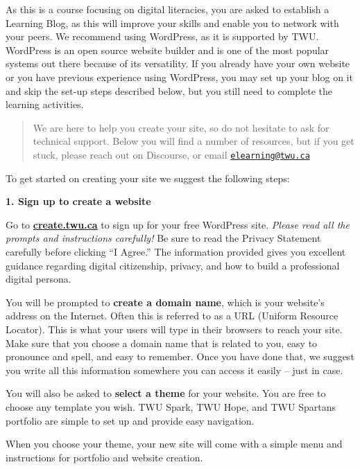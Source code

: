 \documentclass[
]{book}
\theoremstyle{definition}
\theoremstyle{definition}
\theoremstyle{definition}
\theoremstyle{definition}
\theoremstyle{remark}
\begin{document}
\begin{reflect}
As this is a course focusing on digital literacies, you are asked to establish a Learning Blog, as this will improve your skills and enable you to network with your peers. We recommend using WordPress, as it is supported by TWU. WordPress is an open source website builder and is one of the most popular systems out there because of its versatility. If you already have your own website or you have previous experience using WordPress, you may set up your blog on it and skip the set-up steps described below, but you still need to complete the learning activities.

\begin{quote}
We are here to help you create your site, so do not hesitate to ask for technical support. Below you will find a number of resources, but if you get stuck, please reach out on Discourse, or email \href{mailto:elearning@twu.ca}{\nolinkurl{elearning@twu.ca}}
\end{quote}

To get started on creating your site we suggest the following steps:

\textbf{1. Sign up to create a website}

Go to \textbf{\href{https://create.twu.ca/}{create.twu.ca}} to sign up for your free WordPress site. \emph{Please read all the prompts and instructions carefully!}
Be sure to read the Privacy Statement carefully before clicking ``I Agree.'' The information provided gives you excellent guidance regarding digital citizenship, privacy, and how to build a professional digital persona.

You will be prompted to \textbf{create a domain name}, which is your website's address on the Internet. Often this is referred to as a URL (Uniform Resource Locator). This is what your users will type in their browsers to reach your site. Make sure that you choose a domain name that is related to you, easy to pronounce and spell, and easy to remember. Once you have done that, we suggest you write all this information somewhere you can access it easily -- just in case.

You will also be asked to \textbf{select a theme} for your website. You are free to choose any template you wish. TWU Spark, TWU Hope, and TWU Spartans portfolio are simple to set up and provide easy navigation.

When you choose your theme, your new site will come with a simple menu and instructions for portfolio and website creation.


\end{reflect}
\end{document}

